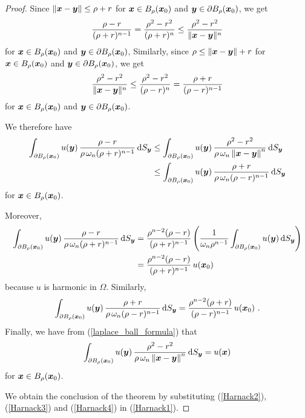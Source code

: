 \begin{proof}
Since $\|{\bm{x}} - {\bm{y}}\| \leq \rho + r$ for
${\bm{x}} \in B_{\rho}({\bm{x}}_0)$ and
${\bm{y}} \in \partial B_{\rho}({\bm{x}}_0)$, we get
\[
\frac{\rho-r}{(\rho+r)^{n-1}} = \frac{\rho^2-r^2}{(\rho+r)^n}
\leq \frac{\rho^2-r^2}{\|{\bm{x}} - {\bm{y}}\|^n}
\]
for
${\bm{x}} \in B_{\rho}({\bm{x}}_0)$ and
${\bm{y}} \in \partial B_{\rho}({\bm{x}}_0)$, 
Similarly, since $\rho \leq \|{\bm{x}} - {\bm{y}}\| + r$ for
${\bm{x}} \in B_{\rho}({\bm{x}}_0)$ and
${\bm{y}} \in \partial B_{\rho}({\bm{x}}_0)$, 
we get
\[
\frac{\rho^2-r^2}{\|{\bm{x}} - {\bm{y}}\|^n} \leq
\frac{\rho^2-r^2}{(\rho-r)^n} = \frac{\rho+r}{(\rho-r)^{n-1}}
\]
for
${\bm{x}} \in B_{\rho}({\bm{x}}_0)$ and
${\bm{y}} \in \partial B_{\rho}({\bm{x}}_0)$.

We therefore have
\begin{equation}\label{Harnack1}
\begin{split}
\int_{\partial B_\rho({\bm{x}}_0)} u({\bm{y}})
\, \frac{\rho-r}{\rho\, \omega_n (\rho+r)^{n-1}} \,\mathrm{d}{S}_{{\bm{y}}}
&\leq \int_{\partial B_\rho({\bm{x}}_0)} u({\bm{y}})\, 
\frac{\rho^2-r^2}{\rho \, \omega_n \left\|{\bm{x}}-{\bm{y}}\right\|^n}
\,\mathrm{d}{S}_{{\bm{y}}} \\
&\leq \int_{\partial B_\rho({\bm{x}}_0)} u({\bm{y}}) \,
\frac{\rho+r}{\rho\, \omega_n (\rho-r)^{n-1}} \,\mathrm{d}{S}_{{\bm{y}}}
\end{split}
\end{equation}
for ${\bm{x}} \in B_{\rho}({\bm{x}}_0)$.

Moreover,
\begin{equation}\label{Harnack2}
\begin{split}
\int_{\partial B_\rho({\bm{x}}_0)} u({\bm{y}})
\, \frac{\rho-r}{\rho\, \omega_n (\rho+r)^{n-1}} \,\mathrm{d}{S}_{{\bm{y}}}
&= \frac{\rho^{n-2}(\rho-r)}{(\rho+r)^{n-1}} \left( \frac{1}{\omega_n \rho^{n-1}}
\int_{\partial B_\rho({\bm{x}}_0)} u({\bm{y}}) \,\mathrm{d}{S}_{{\bm{y}}} \right) \\
&= \frac{\rho^{n-2}(\rho-r)}{(\rho+r)^{n-1}}\, u({\bm{x}}_0)
\end{split}
\end{equation}
because $u$ is harmonic in $\Omega$.  Similarly,
\begin{equation}\label{Harnack3}
\int_{\partial B_\rho({\bm{x}}_0)} u({\bm{y}}) \,
\frac{\rho+r}{\rho\, \omega_n (\rho-r)^{n-1}} \,\mathrm{d}{S}_{{\bm{y}}}
= \frac{\rho^{n-2}(\rho+r)}{(\rho-r)^{n-1}}\, u({\bm{x}}_0) \ .
\end{equation}
Finally, we have from (\ref{laplace_ball_formula}) that
\begin{equation}\label{Harnack4}
\int_{\partial B_\rho({\bm{x}}_0)} u({\bm{y}})\, 
\frac{\rho^2-r^2}{\rho \, \omega_n \left\|{\bm{x}}-{\bm{y}}\right\|^n}
\,\mathrm{d}{S}_{{\bm{y}}} = u({\bm{x}})
\end{equation}
for ${\bm{x}} \in B_{\rho}({\bm{x}}_0)$.

We obtain the conclusion of the theorem by substituting
(\ref{Harnack2}), (\ref{Harnack3}) and (\ref{Harnack4}) in
(\ref{Harnack1}).
\end{proof}


